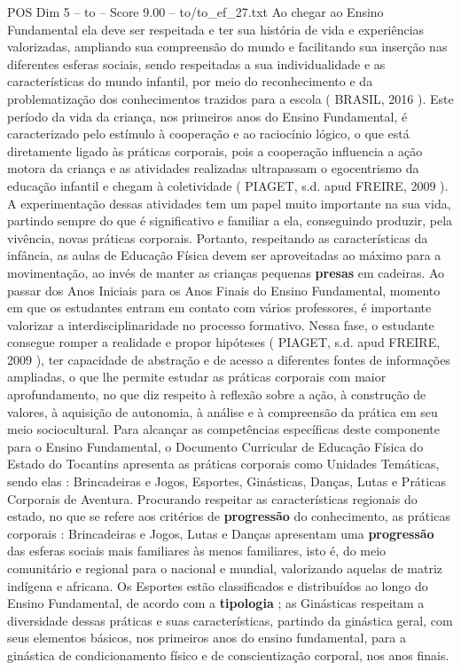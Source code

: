 \begin{textsample}{POS Dim 5 – to – Score 9.00 – to/to\_ef\_27.txt}
Ao chegar ao Ensino Fundamental ela deve ser respeitada e ter sua história de vida e experiências valorizadas, ampliando sua compreensão do mundo e facilitando sua inserção nas diferentes esferas sociais, sendo respeitadas a sua individualidade e as características do mundo infantil, por meio do reconhecimento e da problematização dos conhecimentos trazidos para a escola ( BRASIL, 2016 ).
Este período da vida da criança, nos primeiros anos do Ensino Fundamental, é caracterizado pelo estímulo à cooperação e ao raciocínio lógico, o que está diretamente ligado às práticas corporais, pois a cooperação influencia a ação motora da criança e as atividades realizadas ultrapassam o egocentrismo da educação infantil e chegam à coletividade ( PIAGET, s.d. apud FREIRE, 2009 ).
A experimentação dessas atividades tem um papel muito importante na sua vida, partindo sempre do que é significativo e familiar a ela, conseguindo produzir, pela vivência, novas práticas corporais.
Portanto, respeitando as características da infância, as aulas de Educação Física devem ser aproveitadas ao máximo para a movimentação, ao invés de manter as crianças pequenas \textbf{presas} em cadeiras.
Ao passar dos Anos Iniciais para os Anos Finais do Ensino Fundamental, momento em que os estudantes entram em contato com vários professores, é importante valorizar a interdisciplinaridade no processo formativo.
Nessa fase, o estudante consegue romper a realidade e propor hipóteses ( PIAGET, s.d. apud FREIRE, 2009 ), ter capacidade de abstração e de acesso a diferentes fontes de informações ampliadas, o que lhe permite estudar as práticas corporais com maior aprofundamento, no que diz respeito à reflexão sobre a ação, à construção de valores, à aquisição de autonomia, à análise e à compreensão da prática em seu meio sociocultural.
Para alcançar as competências específicas deste componente para o Ensino Fundamental, o Documento Curricular de Educação Física do Estado do Tocantins apresenta as práticas corporais como Unidades Temáticas, sendo elas : Brincadeiras e Jogos, Esportes, Ginásticas, Danças, Lutas e Práticas Corporais de Aventura.
Procurando respeitar as características regionais do estado, no que se refere aos critérios de \textbf{progressão} do conhecimento, as práticas corporais : Brincadeiras e Jogos, Lutas e Danças apresentam uma \textbf{progressão} das esferas sociais mais familiares às menos familiares, isto é, do meio comunitário e regional para o nacional e mundial, valorizando aquelas de matriz indígena e africana.
Os Esportes estão classificados e distribuídos ao longo do Ensino Fundamental, de acordo com a \textbf{tipologia} ; as Ginásticas respeitam a diversidade dessas práticas e suas características, partindo da ginástica geral, com seus elementos básicos, nos primeiros anos do ensino fundamental, para a ginástica de condicionamento físico e de conscientização corporal, nos anos finais.

\end{textsample}
